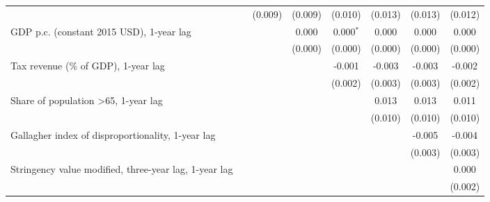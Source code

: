 \begin{table}[htbp]
\begin{tabular}{lccccccc}
                                                                                         &                & (0.009)        & (0.009)        & (0.010)        & (0.013)       & (0.013)       & (0.012)\\   
      GDP p.c. (constant 2015 USD), 1-year lag                                           &                &                & 0.000          & 0.000$^{*}$    & 0.000         & 0.000         & 0.000\\   
                                                                                         &                &                & (0.000)        & (0.000)        & (0.000)       & (0.000)       & (0.000)\\   
      Tax revenue (\% of GDP), 1-year lag                                                &                &                &                & -0.001         & -0.003        & -0.003        & -0.002\\   
                                                                                         &                &                &                & (0.002)        & (0.003)       & (0.003)       & (0.002)\\   
      Share of population >65, 1-year lag                                                &                &                &                &                & 0.013         & 0.013         & 0.011\\   
                                                                                         &                &                &                &                & (0.010)       & (0.010)       & (0.010)\\   
      Gallagher index of disproportionality, 1-year lag                                  &                &                &                &                &               & -0.005        & -0.004\\   
                                                                                         &                &                &                &                &               & (0.003)       & (0.003)\\   
      Stringency value modified, three-year lag, 1-year lag                              &                &                &                &                &               &               & 0.000\\   
                                                                                         &                &                &                &                &               &               & (0.002)\\   

\end{tabular}
\end{table}
